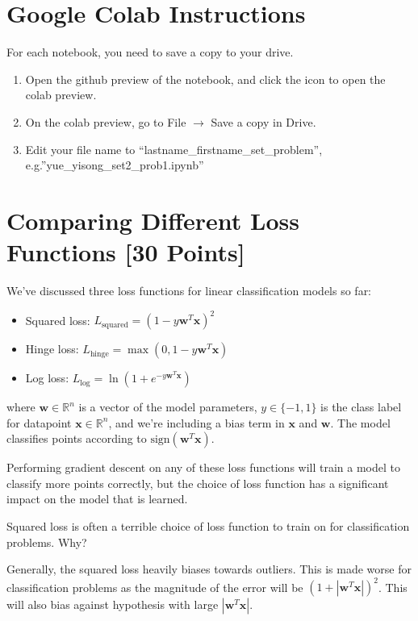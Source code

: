 \section*{Google Colab Instructions}
For each notebook, you need to save a copy to your drive.
\begin{enumerate}
	\item Open the github preview of the notebook, and click the icon to open the colab preview.
	\item On the colab preview, go to File $\rightarrow$ Save a copy in Drive.
	\item Edit your file name to “lastname_firstname_set_problem”, e.g.”yue_yisong_set2_prob1.ipynb”
\end{enumerate}



\newpage
\section{Comparing Different Loss Functions [30 Points]}

We've discussed three loss functions for linear classification models so far:
\begin{itemize}
\item Squared loss: $L_\text{squared} = (1 - y\mathbf{w}^T\mathbf{x})^2$
\item Hinge loss: $L_\text{hinge} = \max(0, 1 - y\mathbf{w}^T\mathbf{x})$
\item Log loss: $L_\text{log} = \ln(1 + e^{-y\mathbf{w}^T\mathbf{x}})$
\end{itemize}
where $\mathbf{w} \in \mathbb{R}^n$ is a vector of the model parameters, $y \in \{-1,1\}$ is the class label for datapoint $\mathbf{x} \in \mathbb{R}^n$, and we're including a bias term in $\mathbf{x}$ and $\mathbf{w}$.  The model classifies points according to $\text{sign}(\mathbf{w}^T\mathbf{x})$.

Performing gradient descent on any of these loss functions will train a model to classify more points correctly, but the choice of loss function has a significant impact on the model that is learned.

\problem[3]
Squared loss is often a terrible choice of loss function to train on for classification problems.  Why?

\begin{solution}
 Generally, the squared loss heavily biases towards outliers. This is made worse for classification problems as the magnitude of the error will be $(1+|\mathbf{w}^T\mathbf{x}|)^2$. This will also bias against hypothesis with large $|\mathbf{w}^T\mathbf{x}|$.
\end{solution}

